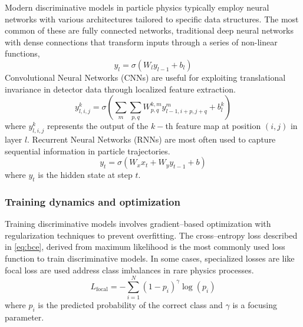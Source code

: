             Modern discriminative models in particle physics typically employ neural networks with various architectures tailored to specific data structures.
            The most common of these are fully connected networks, traditional deep neural networks with dense connections that transform inputs through a series of non-linear functions,
            \begin{equation}
                y_l = \sigma(W_l y_{l-1} + b_l)
            \end{equation}
            Convolutional Neural Networks (CNNs) are useful for exploiting translational invariance in detector data through localized feature extraction.
            \begin{equation}
                y_{l,i,j}^k = \sigma\left(\sum_{m}\sum_{p,q} W_{p,q}^{k,m} y_{l-1,i+p,j+q}^m + b_l^k\right)
            \end{equation}
            where \(y_{l,i,j}^k\) represents the output of the \(k-\)th feature map at position \((i,j)\) in layer \(l\).
            Recurrent Neural Networks (RNNs) are most often used to capture sequential information in particle trajectories.
            \begin{equation}
                y_t = \sigma(W_x x_t + W_y y_{t-1} + b)
            \end{equation}
            where \(y_t\) is the hidden state at step \(t\).
        
            \subsubsection{Training dynamics and optimization}
                Training discriminative models involves gradient--based optimization with regularization techniques to prevent overfitting.
                The cross--entropy loss described in \cref{eq:bce}, derived from maximum likelihood is the most commonly used loss function to train discriminative models.
                In some cases, specialized losses are like focal loss are used address class imbalances in rare physics processes.
                \begin{equation}
                    L_{\text{focal}} = -\sum_{i=1}^N (1-p_i)^\gamma \log(p_i)
                \end{equation}
                where \(p_i\) is the predicted probability of the correct class and \(\gamma\) is a focusing parameter.
    

